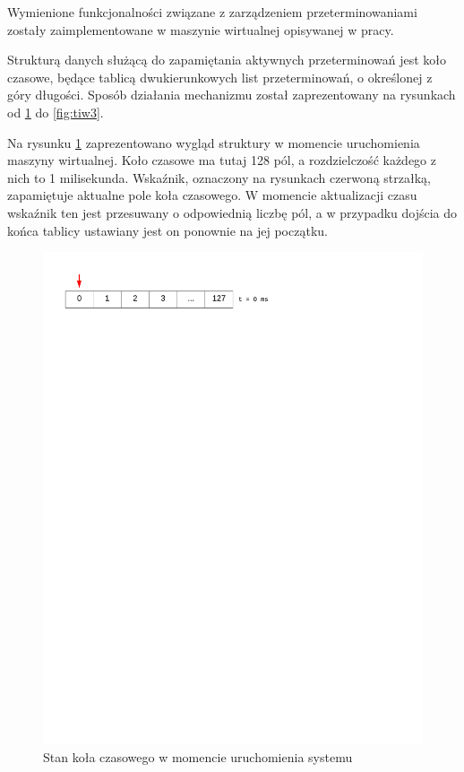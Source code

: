 Wymienione funkcjonalności związane z zarządzeniem przeterminowaniami zostały zaimplementowane w maszynie wirtualnej opisywanej w pracy.

Strukturą danych służącą do zapamiętania aktywnych przeterminowań jest koło czasowe, będące tablicą dwukierunkowych list przeterminowań, o określonej z góry długości. Sposób działania mechanizmu został zaprezentowany na rysunkach od \ref{fig:tiw1} do \ref{fig:tiw3}.

Na rysunku \ref{fig:tiw1} zaprezentowano wygląd struktury w momencie uruchomienia maszyny wirtualnej.
Koło czasowe ma tutaj 128 pól, a rozdzielczość każdego z nich to 1 milisekunda.
Wskaźnik, oznaczony na rysunkach czerwoną strzałką, zapamiętuje aktualne pole koła czasowego.
W momencie aktualizacji czasu wskaźnik ten jest przesuwany o odpowiednią liczbę pól, a w przypadku dojścia do końca tablicy ustawiany jest on ponownie na jej początku.
\begin{figure}[h]
\centerline{\includegraphics[scale=0.75, clip, trim=10mm 245mm 80mm 10mm]{tiw1}}
\caption{Stan koła czasowego w momencie uruchomienia systemu}
\label{fig:tiw1}
\end{figure}

